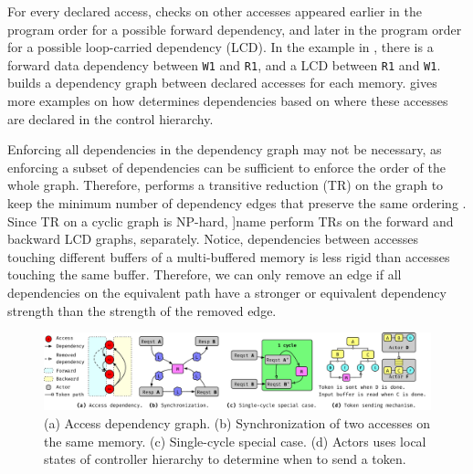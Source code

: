 For every declared access, \name{} checks on other accesses appeared earlier in the program order
for a possible forward dependency, and later in the program order for a possible loop-carried dependency (LCD). 
In the example in , there is a forward data dependency between \texttt{W1} and
\texttt{R1}, and a LCD between \texttt{R1} and \texttt{W1}. 
\name builds a dependency graph between declared accesses for each memory.
\todo{} gives more examples on how \name
determines dependencies based on where these accesses are declared in the control hierarchy.

Enforcing all dependencies in the dependency graph may not be necessary, as enforcing a subset of
dependencies can be sufficient to enforce the order of the whole graph.
Therefore, \name performs a transitive reduction (TR) on the graph to keep the minimum number of dependency edges 
that preserve the same ordering \cite{tr}.
Since TR on a cyclic graph is NP-hard, ]name perform TRs on the forward and backward LCD graphs, separately.
Notice, dependencies between accesses touching different buffers of a multi-buffered memory is less rigid 
than accesses touching the same buffer.
Therefore, we can only remove an edge if all dependencies on the equivalent path have a stronger or equivalent 
dependency strength than the strength of the removed edge.


\begin{figure}
\centering
\includegraphics[width=1.0\textwidth]{figs/synch_mech.pdf}
\caption{
    (a) Access dependency graph.
    (b) Synchronization of two accesses on the same memory.
    (c) Single-cycle special case.
    (d) Actors uses local states of controller hierarchy to determine when to send a token.
}\label{fig:depgraph}\label{fig:token}\label{fig:tokentrick}\label{fig:tokenwhen}
\end{figure}

